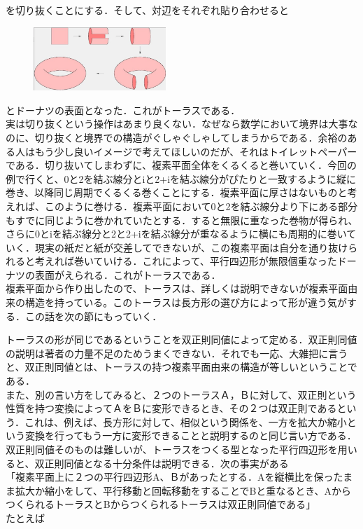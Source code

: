 を切り抜くことにする．そして、対辺をそれぞれ貼り合わせると
\begin{figure}[h]
\includegraphics[width=5cm]{asaka3.png}
\end{figure}
とドーナツの表面となった．これがトーラスである．\\
実は切り抜くという操作はあまり良くない．なぜなら数学において境界は大事なのに、切り抜くと境界での構造がぐしゃぐしゃしてしまうからである．余裕のある人はもう少し良いイメージで考えてほしいのだが、それはトイレットペーパーである．切り抜いてしまわずに、複素平面全体をくるくると巻いていく．今回の例で行くと、0と2を結ぶ線分とiと2+iを結ぶ線分がぴたりと一致するように縦に巻き、以降同じ周期でくるくる巻くことにする．複素平面に厚さはないものと考えれば、このように巻ける．複素平面において0と2を結ぶ線分より下にある部分もすでに同じように巻かれていたとする．すると無限に重なった巻物が得られ、さらに0とiを結ぶ線分と2と2+iを結ぶ線分が重なるように横にも周期的に巻いていく．現実の紙だと紙が交差してできないが、この複素平面は自分を通り抜けられると考えれば巻いていける．これによって、平行四辺形が無限個重なったドーナツの表面がえられる．これがトーラスである．\\
複素平面から作り出したので、トーラスは、詳しくは説明できないが複素平面由来の構造を持っている。このトーラスは長方形の選び方によって形が違う気がする．この話を次の節にもっていく．

トーラスの形が同じであるということを双正則同値によって定める．双正則同値の説明は著者の力量不足のためうまくできない．それでも一応、大雑把に言うと、双正則同値とは、トーラスの持つ複素平面由来の構造が等しいということである．\\
また、別の言い方をしてみると、２つのトーラスＡ，Ｂに対して、双正則という性質を持つ変換によってＡをＢに変形できるとき、その２つは双正則であるという．これは、例えば、長方形に対して、相似という関係を、一方を拡大か縮小という変換を行ってもう一方に変形できることと説明するのと同じ言い方である．\\
双正則同値そのものは難しいが、トーラスをつくる型となった平行四辺形を用いると、双正則同値となる十分条件は説明できる．次の事実がある\\
「複素平面上に２つの平行四辺形A、Ｂがあったとする．Aを縦横比を保ったまま拡大か縮小をして、平行移動と回転移動をすることでBと重なるとき、AからつくられるトーラスとBからつくられるトーラスは双正則同値である」\\
たとえば\\ 

